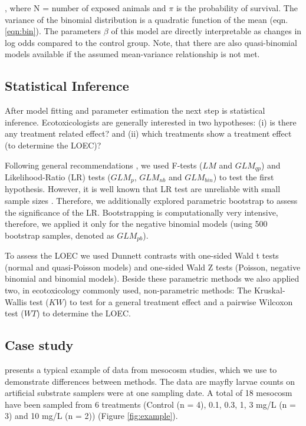 \documentclass{scrartcl}
\begin{document}
, where N = number of exposed animals and $\pi$ is the probability of survival.
The variance of the binomial distribution is a quadratic function of the mean (eqn. \ref{eqn:bin}).
The parameters $\beta$ of this model are directly interpretable as changes in log odds compared to the control group.
Note, that there are also quasi-binomial models available if the assumed mean-variance relationship is not met. 


\subsection{Statistical Inference}
After model fitting and parameter estimation the next step is statistical inference.
Ecotoxicologists are generally interested in two hypotheses: (i) is there any treatment related effect? and (ii) which treatments show a treatment effect (to determine the LOEC)?

Following general recommendations \citep{bolker_generalized_2009,faraway_extending_2006}, we used F-tests ($LM$ and $GLM_{qp}$) and Likelihood-Ratio (LR) tests ($GLM_p$, $GLM_{nb}$ and $GLM_{bin}$) to test the first hypothesis.
However, it is well known that LR test are unreliable with small sample sizes \citep{wilks_large-sample_1938}.
Therefore, we additionally explored parametric bootstrap \citep{faraway_extending_2006} to assess the significance of the LR.
Bootstrapping is computationally very intensive, therefore, we applied it only for the negative binomial models (using 500 bootstrap samples, denoted as $GLM_{pb}$).

To assess the LOEC we used Dunnett contrasts with one-sided Wald t tests (normal and quasi-Poisson models) and one-sided Wald Z tests (Poisson, negative binomial and binomial models).
Beside these parametric methods we also applied two, in ecotoxicology commonly used, non-parametric methods: The Kruskal-Wallis test  ($KW$) to test for a general treatment effect and a pairwise Wilcoxon test ($WT$) to determine the LOEC.



\subsection{Case study}
\citet{brock_minimum_2015} presents a typical example of data from mesocosm studies, which we use to demonstrate differences between methods.
The data are mayfly larvae counts on artificial substrate samplers were at one sampling date. 
A total of 18 mesocosm have been sampled from 6 treatments (Control (n = 4), 0.1, 0.3, 1, 3 mg/L (n = 3) and 10 mg/L (n = 2)) (Figure \ref{fig:example}).
\end{document}
